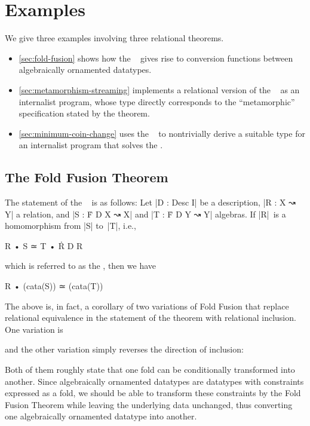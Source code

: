 \section{Examples}
\label{sec:internalism-examples}

We give three examples involving three relational theorems.
\begin{itemize}
\item \autoref{sec:fold-fusion} shows how the ~\citep[Section~6.2]{Bird-AoP} gives rise to conversion functions between algebraically ornamented datatypes.
\item \autoref{sec:metamorphism-streaming} implements a relational version of the ~\citep[Theorem~30]{Bird-arithmetic-coding} as an internalist program, whose type directly corresponds to the ``metamorphic'' specification stated by the theorem.
\item \autoref{sec:minimum-coin-change} uses the ~\citep[Theorem~10.1]{Bird-AoP} to nontrivially derive a suitable type for an internalist program that solves the .
\end{itemize}

\subsection{The Fold Fusion Theorem}
\label{sec:fold-fusion}

The statement of the ~\cite[Section~6.2]{Bird-AoP} is as follows:
Let |D : Desc I| be a description, |R : X ↝ Y| a relation, and |S : Ḟ D X ↝ X| and |T : Ḟ D Y ↝ Y| algebras.
If |R|~is a homomorphism from |S| to~|T|, i.e.,
\begin{code}
R • S ≃ T • Ṙ D R
\end{code}
which is referred to as the , then we have
\begin{code}
R • (cata(S)) ≃ (cata(T))
\end{code}
The above is, in fact, a corollary of two variations of Fold Fusion that replace relational equivalence in the statement of the theorem with relational inclusion.
One variation is
and the other variation simply reverses the direction of inclusion:
Both of them roughly state that one fold can be conditionally transformed into another.
Since algebraically ornamented datatypes are datatypes with constraints expressed as a fold, we should be able to transform these constraints by the Fold Fusion Theorem while leaving the underlying data unchanged, thus converting one algebraically ornamented datatype into another.

